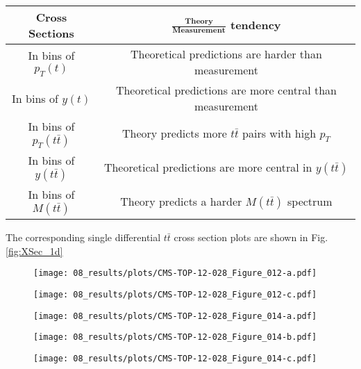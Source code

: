 \begin{center}
 \begin{tabular}{| c | c |}
  \hline
  \textbf{Cross Sections} 		& \textbf{$\frac{\mathbf{\text{Theory}}}{\mathbf{\text{Measurement}}}$ tendency} \\ \hline\hline
  
  In bins of $p_{T}(t)$			& Theoretical predictions are harder than measurement \\ \hline 
  In bins of $y(t)$			& Theoretical predictions are more central than measurement \\ \hline 
  In bins of $p_{T}(t\bar{t})$		& Theory predicts more $t\bar{t}$ pairs with high $p_{T}$ \\ \hline 
  In bins of $y(t\bar{t})$		& Theoretical predictions are more central in $y(t\bar{t})$ \\ \hline
  In bins of $M(t\bar{t})$		& Theory predicts a harder $M(t\bar{t})$ spectrum \\ \hline
 \end{tabular}
\end{center}

The corresponding single differential $t\bar{t}$ cross section plots are shown in Fig. \ref{fig:XSec_1d}

\begin{sidewaysfigure}[p]
\centering
\begin{subfigure}
  \centering
  \texttt{[image: 08\_results/plots/CMS-TOP-12-028\_Figure\_012-a.pdf]}
\end{subfigure}
\begin{subfigure}
  \centering
  \texttt{[image: 08\_results/plots/CMS-TOP-12-028\_Figure\_012-c.pdf]}
\end{subfigure}
\begin{subfigure}
  \centering
  \texttt{[image: 08\_results/plots/CMS-TOP-12-028\_Figure\_014-a.pdf]}
\end{subfigure}
\begin{subfigure}
  \centering
  \texttt{[image: 08\_results/plots/CMS-TOP-12-028\_Figure\_014-b.pdf]}
\end{subfigure}
\begin{subfigure}
  \centering
  \texttt{[image: 08\_results/plots/CMS-TOP-12-028\_Figure\_014-c.pdf]}
\end{subfigure}
\caption{Normalized differential $t\bar{t}$ production cross section in the dilepton channels as a function of the $p_{T}(t)$ (upper left), $y(t)$ (upper middle), 
         $p_{T}(t\bar{t})$ (upper right), $y(t\bar{t})$ (lower left) and $M(t\bar{t})$ (lower right). The data points are placed at the midpoint of the bins. The 
         inner (outer) error bars indicate the statistical (combined statistical and systematic) uncertainties. The measurements are compared to predictions from 
         $\MG+\PYTHIA$, $\Powheg+\PYTHIA$, $\Powheg+\HERWIG$ and $\MCNLO+\HERWIG$, and to NLO+NNLL \cite{Ferroglia:2013zwa, Li:2013mia} calculations, when available. 
         The lower part of each plot shows the ratio of the predictions to data. Plost taken from \cite{Khachatryan:2015oqa}.}
\label{fig:XSec_1d}
\end{sidewaysfigure}

